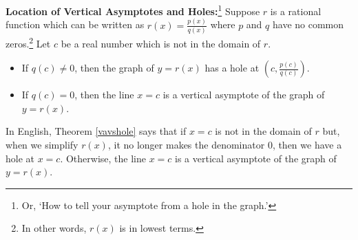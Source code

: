 \smallskip
\colorbox{ResultColor}{\bbm
\begin{thm}  \textbf{Location of Vertical Asymptotes and Holes:}\footnote{Or, `How to tell your asymptote from a hole in the graph.'}  \label{vavshole}  Suppose $r$ is a rational function which can be written as $r(x) = \frac{p(x)}{q(x)}$ where $p$ and $q$ have no common zeros.\footnote{In other words, $r(x)$ is in lowest terms.}  Let $c$ be a real number which is not in the domain of $r$.   

\begin{itemize}

\item  If $q(c) \neq 0$, then the graph of $y=r(x)$ has a hole at $\left(c, \frac{p(c)}{q(c)}\right)$.


\item  If $q(c) = 0$, then the line $x=c$ is a vertical asymptote of the graph of $y=r(x)$.



\end{itemize}

\end{thm}

\ebm}

\smallskip

In English,  Theorem \ref{vavshole} says that if $x=c$ is not in the domain of $r$ but, when we simplify $r(x)$,  it no longer makes the denominator $0$, then we have a hole at $x=c$.  Otherwise, the line $x=c$ is a vertical asymptote  of the graph of $y=r(x)$.  

